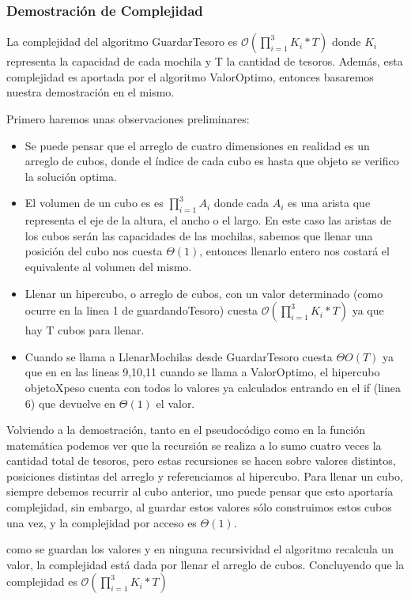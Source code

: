 \documentclass[spanish,12pt]{article}
\begin{document}
{\subsubsection{Demostración de Complejidad}

La complejidad del algoritmo GuardarTesoro es $\mathcal{O}(\prod_{i=1}^{3}K_{i} * T)$ donde $K_i$ representa la capacidad de cada mochila y T la cantidad de tesoros. Además, esta complejidad es aportada por el algoritmo ValorOptimo, entonces basaremos nuestra demostración en el mismo.

Primero haremos unas observaciones preliminares:
\begin{itemize}
	\item Se puede pensar que el arreglo de cuatro dimensiones en realidad es un arreglo de cubos, donde el índice de cada cubo es hasta que objeto se verifico la solución optima. 
	\item El volumen de un cubo es es $\prod_{i=1}^{3}A_{i}$ donde cada $A_i$ es una arista que representa el eje de la altura, el ancho o el largo. En este caso las aristas de los cubos serán las capacidades de las mochilas, sabemos que llenar una posición del cubo nos cuesta $\Theta(1)$, entonces llenarlo entero nos costará el equivalente al volumen del mismo.
	\item Llenar un hipercubo, o arreglo de cubos, con un valor determinado (como ocurre en la linea 1 de guardandoTesoro) cuesta $\mathcal{O}(\prod_{i=1}^{3}K_{i} * T)$ ya que hay T cubos para llenar.
	\item Cuando se llama a LlenarMochilas desde GuardarTesoro cuesta $\Theta{O}(T)$ ya que en en las lineas 9,10,11 cuando se llama a ValorOptimo, el hipercubo objetoXpeso cuenta con todos lo valores ya calculados entrando en el if (linea 6) que devuelve en $\Theta(1)$ el valor.
\end{itemize}

Volviendo a la demostración, tanto en el pseudocódigo como en la función matemática podemos ver que la recursión se realiza a lo sumo cuatro veces la cantidad total de tesoros, pero estas recursiones se hacen sobre valores distintos, posiciones distintas del arreglo y referenciamos al hipercubo. Para llenar un cubo, siempre debemos recurrir al cubo anterior, uno puede pensar que esto aportaría complejidad, sin embargo, al guardar estos valores sólo construimos estos cubos una vez, y la complejidad por acceso es $\Theta(1)$.

como se guardan los valores y en ninguna recursividad  el algoritmo recalcula un valor, la complejidad está dada por llenar el arreglo de cubos. Concluyendo que la complejidad es $\mathcal{O}(\prod_{i=1}^{3}K_{i} * T)$

}
\end{document}
